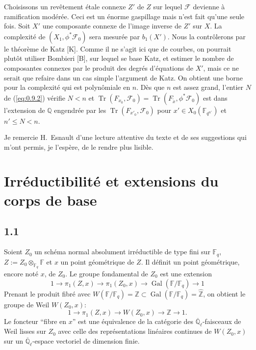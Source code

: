 \documentclass[11pt,a4paper]{article}
\theoremstyle{plain}
\theoremstyle{definition}
\DeclareMathOperator{\Gal}{Gal}
\DeclareMathOperator{\tr}{Tr}
\begin{document}
Choisissons un rev\^etement \'etale connexe $Z'$ de $Z$ sur lequel $\mathcal{F}$ devienne \`a ramification mod\'er\'ee. Ceci est un \'enorme gaspillage mais n'est fait qu'une seule fois. Soit $X'$ une composante connexe de l'image inverse de $Z'$ sur $X$. La complexit\'e de $(X_1, \phi^* \mathcal{F}_0)$ sera mesur\'ee par $b_1(X')$. Nous la contr\^olerons par le th\'eor\`eme de Katz [K]. Comme il ne s'agit ici que de courbes, on pourrait plut\^ot utiliser Bombieri [B], sur lequel se base Katz, et estimer le nombre de composantes connexes par le produit des degr\'es d'\'equations de $X'$, mais ce ne serait que refaire dans un cas simple l'argument de Katz. On obtient une borne pour la complexit\'e qui est polyn\^omiale en $n$. D\`es que $n$ est assez grand, l'entier $N$ de (\ref{eq:0.9.2}) v\'erifie $N < n$ et $\tr(F_{x_0}, \mathcal{F}_0) = \tr(F_{\tilde{x}}, \phi^* \mathcal{F}_0)$ est dans l'extension de $\mathbb{Q}$ engendr\'ee par les $\tr(F_{x'_0}, \mathcal{F}_0)$ pour $x' \in X_0(\mathbb{F}_{q^{n'}})$ et $n' \leq N < n$.

Je remercie H.~Esnault d'une lecture attentive du texte et de ses suggestions qui m'ont permis, je l'esp\`ere, de le rendre plus lisible.

\section{Irr\'eductibilit\'e et extensions du corps de base}

\subsection*{1.1}

Soient $Z_0$ un sch\'ema normal absolument irr\'eductible de type fini sur $\mathbb{F}_q$, $Z := Z_0 \otimes_{\mathbb{F}_q} \mathbb{F}$ et $x$ un point g\'eom\'etrique de $Z$. Il d\'efinit un point g\'eom\'etrique, encore not\'e $x$, de $Z_0$. Le groupe fondamental de $Z_0$ est une extension
\[
1 \to \pi_1(Z,x) \to \pi_1(Z_0,x) \to \Gal(\mathbb{F}/\mathbb{F}_q) \to 1
\]
Prenant le produit fibr\'e avec $W(\mathbb{F}/\mathbb{F}_q) = \mathbb{Z} \subset \Gal(\mathbb{F}/\mathbb{F}_q) = \hat{\mathbb{Z}}$, on obtient le groupe de Weil $W(Z_0,x)$:
\[
1 \to \pi_1(Z,x) \to W(Z_0,x) \to \mathbb{Z} \to 1.
\]
Le foncteur ``fibre en $x$'' est une \'equivalence de la cat\'egorie des $\overline{\mathbb{Q}}_\ell$-faisceaux de Weil lisses sur $Z_0$ avec celle des repr\'esentations lin\'eaires continues de $W(Z_0,x)$ sur un $\overline{\mathbb{Q}}_\ell$-espace vectoriel de dimension finie.
\end{document}

